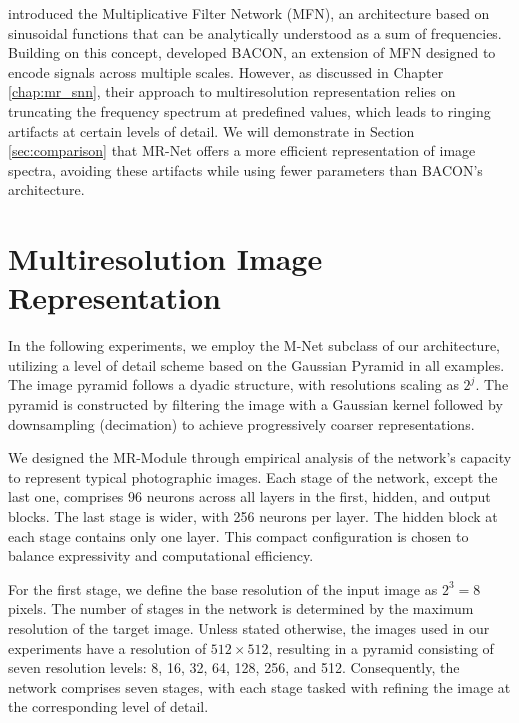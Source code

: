 \citet{fathony2020multiplicative} introduced the Multiplicative Filter Network (MFN), an architecture based on sinusoidal functions that can be analytically understood as a sum of frequencies. Building on this concept, \citet{bacon2021} developed BACON, an extension of MFN designed to encode signals across multiple scales. However, as discussed in Chapter \ref{chap:mr_snn}, their approach to multiresolution representation relies on truncating the frequency spectrum at predefined values, which leads to ringing artifacts at certain levels of detail. We will demonstrate in Section \ref{sec:comparison} that MR-Net offers a more efficient representation of image spectra, avoiding these artifacts while using fewer parameters than BACON's architecture.


\section{Multiresolution Image Representation}
\label{s:img}


In the following experiments, we employ the M-Net subclass of our architecture, utilizing a level of detail scheme based on the Gaussian Pyramid in all examples. The image pyramid follows a dyadic structure, with resolutions scaling as \( 2^j \). The pyramid is constructed by filtering the image with a Gaussian kernel followed by downsampling (decimation) to achieve progressively coarser representations.

We designed the MR-Module through empirical analysis of the network's capacity to represent typical photographic images. Each stage of the network, except the last one, comprises 96 neurons across all layers in the first, hidden, and output blocks. The last stage is wider, with 256 neurons per layer. The hidden block at each stage contains only one layer. This compact configuration is chosen to balance expressivity and computational efficiency.  

For the first stage, we define the base resolution of the input image as \( 2^3 = 8 \) pixels. The number of stages in the network is determined by the maximum resolution of the target image. Unless stated otherwise, the images used in our experiments have a resolution of \(512 \times 512\), resulting in a pyramid consisting of seven resolution levels: 8, 16, 32, 64, 128, 256, and 512. Consequently, the network comprises seven stages, with each stage tasked with refining the image at the corresponding level of detail.

